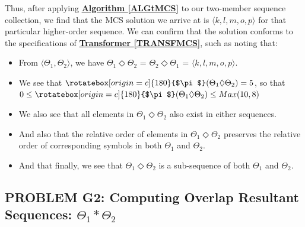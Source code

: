 \documentclass[a4paper, 18pt]{book} %
\newcommand{\invpi}{\rotatebox[origin=c]{180}{$\pi$}}
\begin{document}
\vspace{2em}

Thus, after applying  \textbf{\hyperref[ALGtMCS]{Algorithm \ref{ALGtMCS}}} to our two-member sequence collection, we find that the MCS solution we arrive at is $\langle k, l, m, o, p\rangle$ for that particular higher-order sequence. We can confirm that the solution conforms to the specifications of \textbf{\hyperref[TRANSFMCS]{Transformer \ref{TRANSFMCS}}}, such as noting that:

\begin{itemize}
\item From $\langle \Theta_1, \Theta_2 \rangle$, we have $\Theta_1 \Diamond \Theta_2$ = $\Theta_2 \Diamond \Theta_1$ =  $\langle k, l, m, o, p\rangle$.
\item We see that $\invpi(\Theta_1 \Diamond \Theta_2) = 5$, so that $ 0 \leq \invpi(\Theta_1 \Diamond \Theta_2) \leq Max(10, 8)$
\item We also see that all elements in $\Theta_1 \Diamond \Theta_2$ also exist in either sequences.
\item And also that the relative order of elements in $\Theta_1 \Diamond \Theta_2$ preserves the relative order of corresponding symbols in both $\Theta_1$ and $\Theta_2$.
\item And that finally, we see that $\Theta_1 \Diamond \Theta_2$ is a sub-sequence of both $\Theta_1$ and $\Theta_2$.
\end{itemize}





\subsection{PROBLEM G2: Computing Overlap Resultant Sequences: $\Theta_1 \ast \Theta_2$}
\label{PROBG2}
\end{document}
